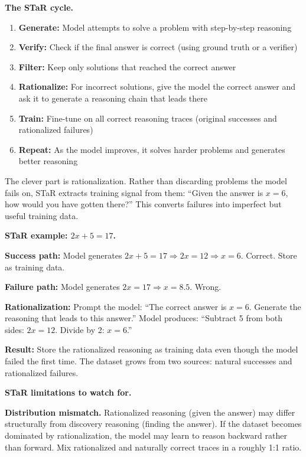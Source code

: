 \begin{chapterenv}
\begin{infobox}
\textbf{The STaR cycle.}

\begin{enumerate}
\item \textbf{Generate:} Model attempts to solve a problem with step-by-step reasoning
\item \textbf{Verify:} Check if the final answer is correct (using ground truth or a verifier)
\item \textbf{Filter:} Keep only solutions that reached the correct answer
\item \textbf{Rationalize:} For incorrect solutions, give the model the correct answer and ask it to generate a reasoning chain that leads there
\item \textbf{Train:} Fine-tune on all correct reasoning traces (original successes and rationalized failures)
\item \textbf{Repeat:} As the model improves, it solves harder problems and generates better reasoning
\end{enumerate}

The clever part is rationalization. Rather than discarding problems the model fails on, STaR extracts training signal from them: ``Given the answer is $x=6$, how would you have gotten there?'' This converts failures into imperfect but useful training data.
\end{infobox}

\begin{infobox}
\textbf{STaR example: $2x + 5 = 17$.}

\textbf{Success path:} Model generates $2x + 5 = 17 \Rightarrow 2x = 12 \Rightarrow x = 6$. Correct. Store as training data.

\textbf{Failure path:} Model generates $2x = 17 \Rightarrow x = 8.5$. Wrong.

\textbf{Rationalization:} Prompt the model: ``The correct answer is $x = 6$. Generate the reasoning that leads to this answer.'' Model produces: ``Subtract 5 from both sides: $2x = 12$. Divide by 2: $x = 6$.''

\textbf{Result:} Store the rationalized reasoning as training data even though the model failed the first time. The dataset grows from two sources: natural successes and rationalized failures.
\end{infobox}

\begin{tipbox}
\textbf{STaR limitations to watch for.}

\textbf{Distribution mismatch.} Rationalized reasoning (given the answer) may differ structurally from discovery reasoning (finding the answer). If the dataset becomes dominated by rationalization, the model may learn to reason backward rather than forward. Mix rationalized and naturally correct traces in a roughly 1:1 ratio.


\end{tipbox}
\end{chapterenv}

